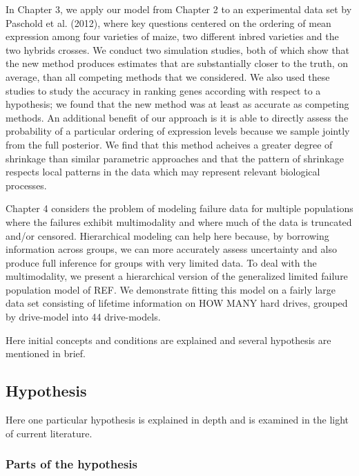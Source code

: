 In Chapter 3, we apply our model from Chapter 2 to an experimental data set by Paschold et al. (2012), where key questions centered on the ordering of mean expression among four varieties of maize, two different inbred varieties and the two hybrids crosses. We conduct two simulation studies, both of which show that the new method produces estimates that are substantially closer to the truth, on average, than all competing methods that we considered. We also used these studies to study the accuracy in ranking genes according with respect to a hypothesis; we found that the new method was at least as accurate as competing methods. An additional benefit of our approach is it is able to directly assess the probability of a particular ordering of expression levels because we sample jointly from the full posterior. We find that this method acheives a greater degree of shrinkage than similar parametric approaches and that the pattern of shrinkage respects local patterns in the data which may represent relevant biological processes.

Chapter 4 considers the problem of modeling failure data for multiple populations where the failures exhibit multimodality and where much of the data is truncated and/or censored. Hierarchical modeling can help here because, by borrowing information across groups, we can more accurately assess uncertainty and also produce full inference for groups with very limited data. To deal with the multimodality, we present a hierarchical version of the generalized limited failure population model of REF. We demonstrate fitting this model on a fairly large data set consisting of lifetime information on HOW MANY hard drives, grouped by drive-model into 44 drive-models.





Here initial concepts and conditions are explained and
several hypothesis are mentioned in brief.

\subsection{Hypothesis}

Here one particular hypothesis is explained in depth
and is examined in the light of current literature.

\subsubsection{Parts of the hypothesis}

